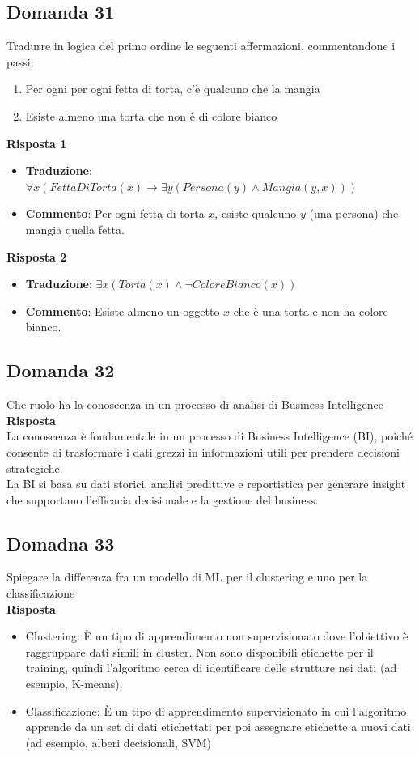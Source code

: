 \documentclass[../main.tex]{subfiles}
\begin{document}
	\subsection{Domanda 31}
	Tradurre in logica del primo ordine le seguenti affermazioni, commentandone i passi:
	\begin{enumerate}
		\item Per ogni per ogni fetta di torta, c’è qualcuno che la mangia 
		\item Esiste almeno una torta che non è di colore bianco
	\end{enumerate}
	\textbf{Risposta 1}\\
	\begin{itemize}
		\item \textbf{Traduzione}: $\forall x (FettaDiTorta(x) \to \exists y (Persona(y) \land Mangia(y, x)))$
		\item \textbf{Commento}: Per ogni fetta di torta $x$, esiste qualcuno $y$ (una persona) che mangia quella fetta.
	\end{itemize}
	\textbf{Risposta 2}
	\begin{itemize}
		\item \textbf{Traduzione}: $\exists x (Torta(x) \land \neg ColoreBianco(x))$
		\item \textbf{Commento}: Esiste almeno un oggetto $x$ che è una torta e non ha colore bianco.
	\end{itemize}
	\subsection{Domanda 32}
	Che ruolo ha la conoscenza in un processo di analisi di Business Intelligence\\
	\textbf{Risposta}\\
	La conoscenza è fondamentale in un processo di Business Intelligence (BI), poiché consente di trasformare i dati grezzi in informazioni utili per prendere decisioni strategiche.\\
	La BI si basa su dati storici, analisi predittive e reportistica per generare insight che supportano l'efficacia decisionale e la gestione del business.
	\subsection{Domadna 33}
	Spiegare la differenza fra un modello di ML per il clustering e uno per la classificazione\\
	\textbf{Risposta}
	\begin{itemize}
		\item Clustering: È un tipo di apprendimento non supervisionato dove l'obiettivo è raggruppare dati simili in cluster. Non sono disponibili etichette per il training, quindi l'algoritmo cerca di identificare delle strutture nei dati (ad esempio, K-means).
		\item Classificazione: È un tipo di apprendimento supervisionato in cui l'algoritmo apprende da un set di dati etichettati per poi assegnare etichette a nuovi dati (ad esempio, alberi decisionali, SVM)
	\end{itemize}
\end{document}
